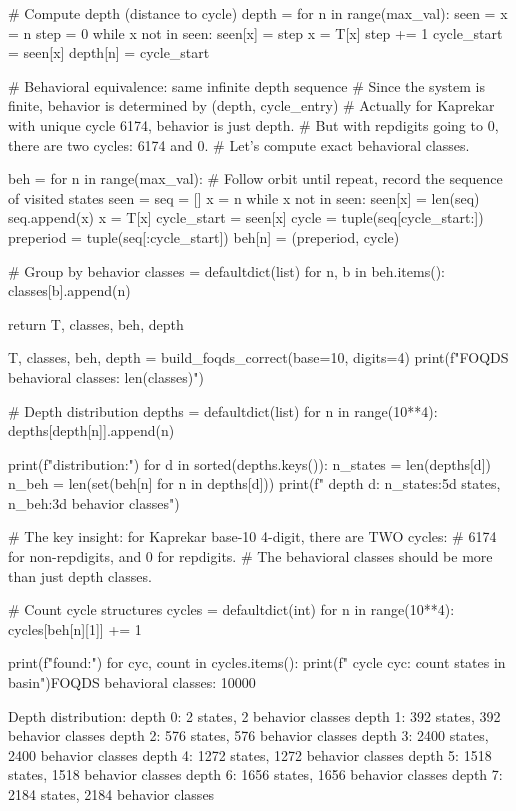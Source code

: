 {{{{{{{{{{{{{    # Compute depth (distance to cycle)
    depth = {}
    for n in range(max_val):
        seen = {}
        x = n
        step = 0
        while x not in seen:
            seen[x] = step
            x = T[x]
            step += 1
        cycle_start = seen[x]
        depth[n] = cycle_start
    
    # Behavioral equivalence: same infinite depth sequence
    # Since the system is finite, behavior is determined by (depth, cycle_entry)
    # Actually for Kaprekar with unique cycle {6174}, behavior is just depth.
    # But with repdigits going to 0, there are two cycles: {6174} and {0}.
    # Let's compute exact behavioral classes.
    
    beh = {}
    for n in range(max_val):
        # Follow orbit until repeat, record the sequence of visited states
        seen = {}
        seq = []
        x = n
        while x not in seen:
            seen[x] = len(seq)
            seq.append(x)
            x = T[x]
        cycle_start = seen[x]
        cycle = tuple(seq[cycle_start:])
        preperiod = tuple(seq[:cycle_start])
        beh[n] = (preperiod, cycle)
    
    # Group by behavior
    classes = defaultdict(list)
    for n, b in beh.items():
        classes[b].append(n)
    
    return T, classes, beh, depth

T, classes, beh, depth = build_foqds_correct(base=10, digits=4)
print(f"FOQDS behavioral classes: {len(classes)}")

# Depth distribution
depths = defaultdict(list)
for n in range(10**4):
    depths[depth[n]].append(n)

print(f"\nDepth distribution:")
for d in sorted(depths.keys()):
    n_states = len(depths[d])
    n_beh = len(set(beh[n] for n in depths[d]))
    print(f"  depth {d}: {n_states:5d} states, {n_beh:3d} behavior classes")

# The key insight: for Kaprekar base-10 4-digit, there are TWO cycles:
# {6174} for non-repdigits, and {0} for repdigits.
# The behavioral classes should be more than just depth classes.

# Count cycle structures
cycles = defaultdict(int)
for n in range(10**4):
    cycles[beh[n][1]] += 1

print(f"\nCycles found:")
for cyc, count in cycles.items():
    print(f"  cycle {cyc}: {count} states in basin")FOQDS behavioral classes: 10000

Depth distribution:
  depth 0:     2 states,   2 behavior classes
  depth 1:   392 states, 392 behavior classes
  depth 2:   576 states, 576 behavior classes
  depth 3:  2400 states, 2400 behavior classes
  depth 4:  1272 states, 1272 behavior classes
  depth 5:  1518 states, 1518 behavior classes
  depth 6:  1656 states, 1656 behavior classes
  depth 7:  2184 states, 2184 behavior classes

}}}}}}}}}}}}}
